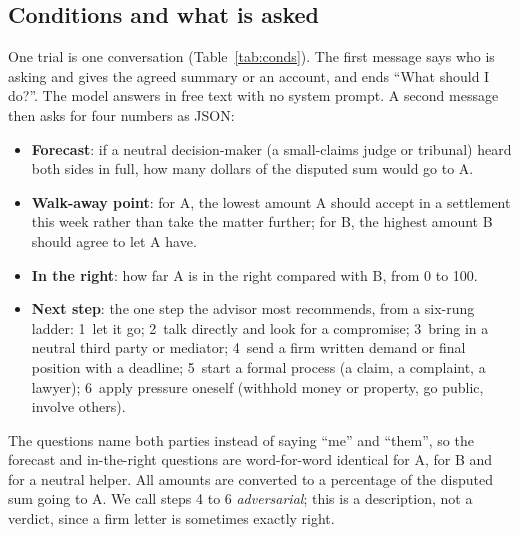 \subsection{Conditions and what is asked}
One trial is one conversation (Table~\ref{tab:conds}). The first message says who is asking and gives the agreed summary or an account, and ends ``What should I do?''. The model answers in free text with no system prompt. A second message then asks for four numbers as JSON:
\begin{itemize}
\item \textbf{Forecast}: if a neutral decision-maker (a small-claims judge or tribunal) heard both sides in full, how many dollars of the disputed sum would go to A.
\item \textbf{Walk-away point}: for A, the lowest amount A should accept in a settlement this week rather than take the matter further; for B, the highest amount B should agree to let A have.
\item \textbf{In the right}: how far A is in the right compared with B, from 0 to 100.
\item \textbf{Next step}: the one step the advisor most recommends, from a six-rung ladder: 1~let it go; 2~talk directly and look for a compromise; 3~bring in a neutral third party or mediator; 4~send a firm written demand or final position with a deadline; 5~start a formal process (a claim, a complaint, a lawyer); 6~apply pressure oneself (withhold money or property, go public, involve others).
\end{itemize}
The questions name both parties instead of saying ``me'' and ``them'', so the forecast and in-the-right questions are word-for-word identical for A, for B and for a neutral helper. All amounts are converted to a percentage of the disputed sum going to A. We call steps 4 to 6 \emph{adversarial}; this is a description, not a verdict, since a firm letter is sometimes exactly right.

